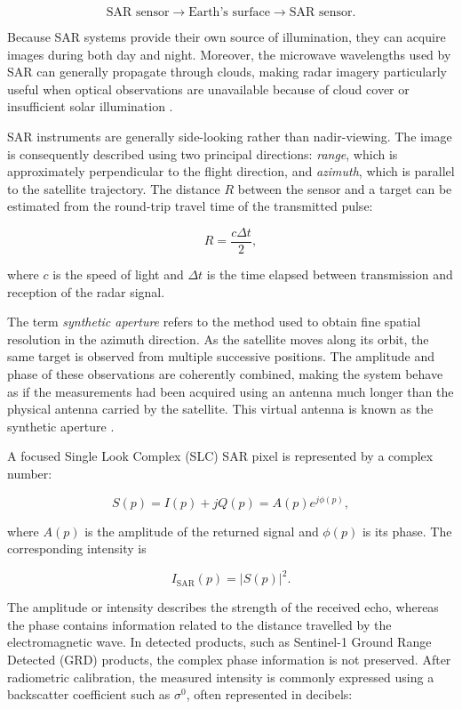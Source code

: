\documentclass[11pt,a4paper]{article}
\begin{document}
\[
\text{SAR sensor}
\longrightarrow
\text{Earth's surface}
\longrightarrow
\text{SAR sensor}.
\]

Because SAR systems provide their own source of illumination, they can
acquire images during both day and night. Moreover, the microwave
wavelengths used by SAR can generally propagate through clouds, making
radar imagery particularly useful when optical observations are
unavailable because of cloud cover or insufficient solar illumination
\cite{esa_sentinel1_instrument}.

SAR instruments are generally side-looking rather than nadir-viewing.
The image is consequently described using two principal directions:
\textit{range}, which is approximately perpendicular to the flight
direction, and \textit{azimuth}, which is parallel to the satellite
trajectory. The distance \(R\) between the sensor and a target can be
estimated from the round-trip travel time of the transmitted pulse:

\[
R = \frac{c\Delta t}{2},
\]

where \(c\) is the speed of light and \(\Delta t\) is the time elapsed
between transmission and reception of the radar signal.

The term \textit{synthetic aperture} refers to the method used to obtain
fine spatial resolution in the azimuth direction. As the satellite moves
along its orbit, the same target is observed from multiple successive
positions. The amplitude and phase of these observations are coherently
combined, making the system behave as if the measurements had been
acquired using an antenna much longer than the physical antenna carried
by the satellite. This virtual antenna is known as the synthetic
aperture \cite{moreira2013sar}.

A focused Single Look Complex (SLC) SAR pixel is represented by a complex
number:

\[
S(p) = I(p) + jQ(p) = A(p)e^{j\phi(p)},
\]

where \(A(p)\) is the amplitude of the returned signal and \(\phi(p)\) is
its phase. The corresponding intensity is

\[
I_{\mathrm{SAR}}(p) = |S(p)|^2.
\]

The amplitude or intensity describes the strength of the received echo,
whereas the phase contains information related to the distance travelled
by the electromagnetic wave. In detected products, such as Sentinel-1
Ground Range Detected (GRD) products, the complex phase information is
not preserved. After radiometric calibration, the measured intensity is
commonly expressed using a backscatter coefficient such as
\(\sigma^0\), often represented in decibels:
\end{document}
